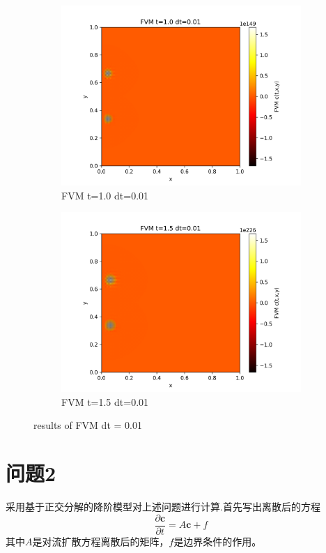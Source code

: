 \documentclass[11pt,a4 paper,one side]{article}
\begin{document}
\begin{figure}[htbp]
    \begin{subfigure}{0.45\textwidth}
        \includegraphics[width=\textwidth]{FVM t=1.0 dt=0.01.png}
        \caption{FVM t=1.0 dt=0.01}
        \label{FVM t=1.0 dt=0.01}
    \end{subfigure}
    \hfill
    \begin{subfigure}{0.45\textwidth}
        \includegraphics[width=\textwidth]{FVM t=1.5 dt=0.01.png}
        \caption{FVM t=1.5 dt=0.01}
        \label{FVM t=1.5 dt=0.01}
    \end{subfigure}
    \caption{results of FVM dt = 0.01}
    \label{results of FVM dt = 0.01}
\end{figure}
\section{问题2}
采用基于正交分解的降阶模型对上述问题进行计算.首先写出离散后的方程\begin{equation}
    \frac{\partial \mathbf{c}}{\partial t} = A\mathbf{c}+f
\end{equation}
其中$A$是对流扩散方程离散后的矩阵，$f$是边界条件的作用。
\end{document}
